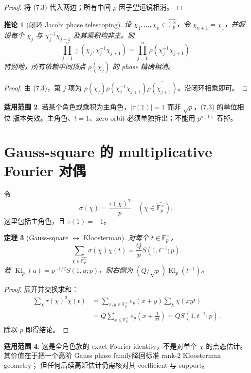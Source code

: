 \documentclass[11pt,a4paper]{ctexart}
\newtheorem{theorem}{定理}[section]
\newtheorem{corollary}[theorem]{推论}
\theoremstyle{definition}
\newtheorem{remark}[theorem]{适用范围}
\newcommand{\F}{\mathbb F}
\newcommand{\G}{\F_p^\times}
\newcommand{\Gh}{\widehat{\G}}
\newcommand{\ep}{e_p}
\newcommand{\1}{\mathbf 1}
\newcommand{\Kl}{\operatorname{Kl}}
\begin{document}
\begin{proof}
将 (7.3) 代入两边；所有中间 $\rho$ 因子望远镜相消。
\end{proof}

\begin{corollary}[闭环 Jacobi phase telescoping]
设 $\chi_1,\ldots,\chi_n\in\Gh$，令 $\chi_{n+1}=\chi_1$，并假设每个
$\chi_j$ 与 $\chi_j^{-1}\chi_{j+1}$ 及其乘积均非主。则
\[
\prod_{j=1}^n
\jmath(\chi_j,\chi_j^{-1}\chi_{j+1})
=\prod_{j=1}^n\rho(\chi_j^{-1}\chi_{j+1}).
\tag{7.5}
\]
特别地，所有依赖中间顶点 $\rho(\chi_j)$ 的 phase 精确相消。
\end{corollary}

\begin{proof}
由 (7.3)，第 $j$ 项为
$\rho(\chi_j)\rho(\chi_j^{-1}\chi_{j+1})
\overline{\rho(\chi_{j+1})}$。沿闭环相乘即可。
\end{proof}

\begin{remark}
若某个角色或乘积为主角色，$|\tau(1)|=1$ 而非 $\sqrt p$，(7.3) 的单位相位
版本失效。主角色、$t=1$、zero orbit 必须单独拆出；不能用 $p^{o(1)}$ 吞掉。
\end{remark}

\section{Gauss-square 的 multiplicative Fourier 对偶}

令
\[
\sigma(\chi)=\frac{\tau(\chi)^2}{p}
\quad(\chi\in\Gh),
\tag{8.1}
\]
这里包括主角色，且 $\tau(1)=-1$。

\begin{theorem}[Gauss-square $\leftrightarrow$ Kloosterman]
对每个 $t\in\G$，
\[
\boxed{
\sum_{\chi\in\Gh}\sigma(\chi)\chi(t)
=\frac Qp S(1,t^{-1};p).}
\tag{8.2}
\]
若 $\Kl_p(a)=p^{-1/2}S(1,a;p)$，则右侧为
\((Q/\sqrt p)\Kl_p(t^{-1})\)。
\end{theorem}

\begin{proof}
展开并交换求和：
\begin{align*}
\sum_\chi\tau(\chi)^2\chi(t)
&=\sum_{x,y\in\G}\ep(x+y)
\sum_\chi\chi(xyt)\\
&=Q\sum_{x\in\G}\ep\!\left(x+\frac1{xt}\right)
=Q S(1,t^{-1};p).
\end{align*}
除以 $p$ 即得结论。
\end{proof}

\begin{remark}
这是全角色族的 exact Fourier identity，不是对单个 $\chi$ 的点态估计。
其价值在于把一个高阶 Gauss phase family降回标准 rank-$2$ Kloosterman geometry；
但任何后续高矩估计仍需核对其 coefficient 与 support。
\end{remark}
\end{document}
